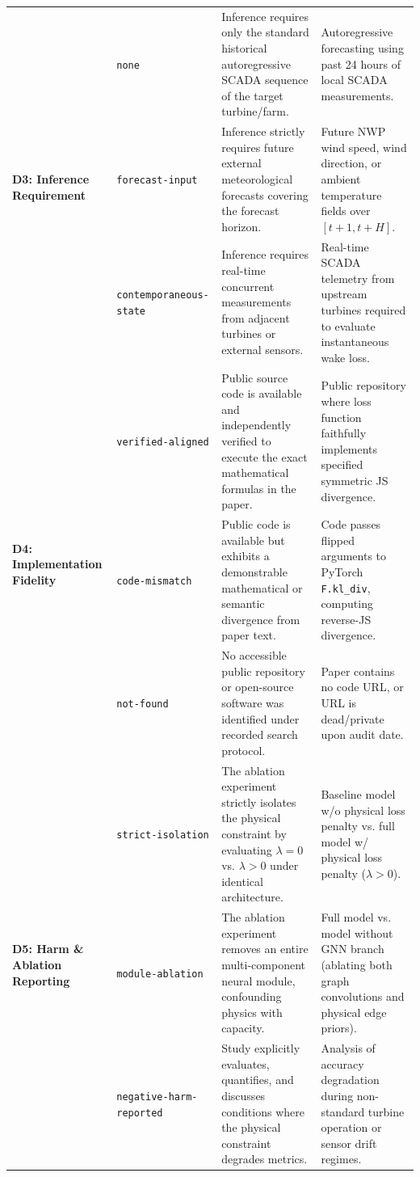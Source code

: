 \documentclass[preprint,3p,times]{elsarticle}
\begin{document}
\begin{table}[t]
\begin{tabular}{p{2.8cm}p{3.2cm}p{5.5cm}p{4.2cm}}
\midrule
\multirow{3}{*}{\textbf{D3: Inference Requirement}} 
& \texttt{none} & Inference requires only the standard historical autoregressive SCADA sequence of the target turbine/farm. & Autoregressive forecasting using past 24 hours of local SCADA measurements. \\
& \texttt{forecast-input} & Inference strictly requires future external meteorological forecasts covering the forecast horizon. & Future NWP wind speed, wind direction, or ambient temperature fields over $[t+1, t+H]$. \\
& \texttt{contemporaneous-state} & Inference requires real-time concurrent measurements from adjacent turbines or external sensors. & Real-time SCADA telemetry from upstream turbines required to evaluate instantaneous wake loss. \\
\midrule
\multirow{3}{*}{\textbf{D4: Implementation Fidelity}} 
& \texttt{verified-aligned} & Public source code is available and independently verified to execute the exact mathematical formulas in the paper. & Public repository where loss function faithfully implements specified symmetric JS divergence. \\
& \texttt{code-mismatch} & Public code is available but exhibits a demonstrable mathematical or semantic divergence from paper text. & Code passes flipped arguments to PyTorch \texttt{F.kl\_div}, computing reverse-JS divergence. \\
& \texttt{not-found} & No accessible public repository or open-source software was identified under recorded search protocol. & Paper contains no code URL, or URL is dead/private upon audit date. \\
\midrule
\multirow{3}{*}{\textbf{D5: Harm \& Ablation Reporting}} 
& \texttt{strict-isolation} & The ablation experiment strictly isolates the physical constraint by evaluating $\lambda=0$ vs. $\lambda > 0$ under identical architecture. & Baseline model w/o physical loss penalty vs. full model w/ physical loss penalty ($\lambda > 0$). \\
& \texttt{module-ablation} & The ablation experiment removes an entire multi-component neural module, confounding physics with capacity. & Full model vs. model without GNN branch (ablating both graph convolutions and physical edge priors). \\
& \texttt{negative-harm-reported} & Study explicitly evaluates, quantifies, and discusses conditions where the physical constraint degrades metrics. & Analysis of accuracy degradation during non-standard turbine operation or sensor drift regimes. \\
\bottomrule
\end{tabular}
\end{table}
\end{document}
